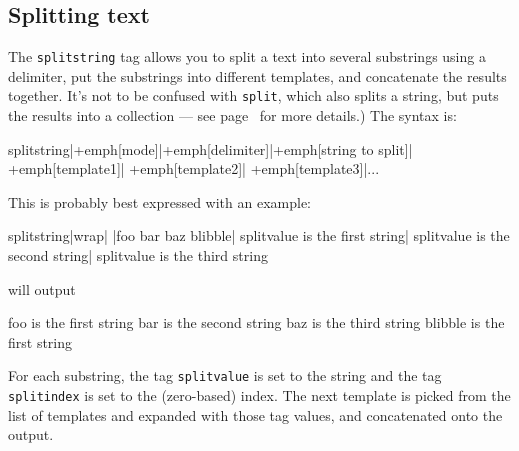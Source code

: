 \subsection{Splitting text}
The \texttt{splitstring} tag allows you to split a text into several substrings using a delimiter, 
put the substrings into different templates, and concatenate the results together. It's not to be confused with \texttt{split}, which also splits
a string, but puts the results into a collection --- see page~\pageref{collsplit}
for more details.)
The syntax is:
\begin{MyVerbatim}[commandchars=+\[\]]
{{splitstring|+emph[mode]|+emph[delimiter]|+emph[string to split]|
    +emph[template1]|
    +emph[template2]|
    +emph[template3]|...}}
\end{MyVerbatim}
This is probably best expressed with an example:
\begin{MyVerbatim}
{{splitstring|wrap| |foo bar baz blibble|
    {{splitvalue}} is the first string|
    {{splitvalue}} is the second string|
    {{splitvalue}} is the third string}}
\end{MyVerbatim}
will output
\begin{MyVerbatim}
foo is the first string bar is the second string baz is the third string
blibble is the first string
\end{MyVerbatim}
For each substring, the tag \texttt{splitvalue} is set to the string and the tag \texttt{splitindex}
is set to the (zero-based) index. The next template is picked from the list of templates and expanded
with those tag values, and concatenated onto the output.

